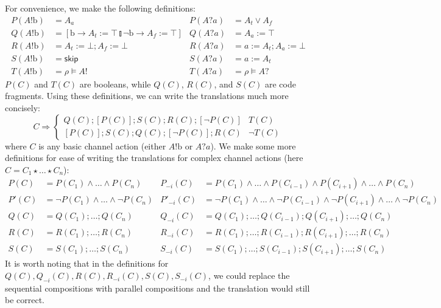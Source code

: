 \documentclass[times, 10pt]{article}
\begin{document}
For convenience, we make the following definitions:
\begin{align*}
    P(A!\mathrm{b}) & = A_a & P(A?a) & = A_t \vee A_f \\
    Q(A!\mathrm{b}) & = [\mathrm{b} \rightarrow A_t := \top \talloblong \neg \mathrm{b} \rightarrow A_f := \top] & Q(A?a) & = A_a := \top \\
    R(A!\mathrm{b}) & = A_t := \bot; A_f := \bot & R(A?a) & = a := A_t; A_a := \bot \\
    S(A!\mathrm{b}) & = \mathsf{skip} & S(A?a) & = a := A_t \\
    T(A!\mathrm{b}) & = \rho \vDash A! & T(A?a) & = \rho \vDash A?
\end{align*}
$P(C)$ and $T(C)$ are booleans, while $Q(C)$, $R(C)$, and $S(C)$ are code
fragments. Using these definitions, we can write the translations much more
concisely:
$$
    C \Rightarrow \begin{cases}
        Q(C); [P(C)]; S(C); R(C); [\neg P(C)] & T(C) \\
        [P(C)]; S(C); Q(C); [\neg P(C)]; R(C) & \neg T(C)
    \end{cases}
$$
where $C$ is any basic channel action (either $A!\mathrm{b}$ or $A?a$). We make
some more definitions for ease of writing the translations for complex channel
actions (here $C = C_1 \star \ldots \star C_n$):
\begin{align*}
    P(C) & = P(C_1) \wedge \ldots \wedge P(C_n) & P_{-i}(C) & = P(C_1) \wedge \ldots \wedge P(C_{i - 1}) \wedge P(C_{i + 1}) \wedge \ldots \wedge P(C_n) \\
    P'(C) & = \neg P(C_1) \wedge \ldots \wedge \neg P(C_n) & P'_{-i}(C) & = \neg P(C_1) \wedge \ldots \wedge \neg P(C_{i - 1}) \wedge \neg P(C_{i + 1}) \wedge \ldots \wedge \neg P(C_n) \\
    Q(C) & = Q(C_1); \ldots; Q(C_n) & Q_{-i}(C) & = Q(C_1); \ldots; Q(C_{i - 1}); Q(C_{i + 1}); \ldots; Q(C_n) \\
    R(C) & = R(C_1); \ldots; R(C_n) & R_{-i}(C) & = R(C_1); \ldots; R(C_{i - 1}); R(C_{i + 1}); \ldots; R(C_n) \\
    S(C) & = S(C_1); \ldots; S(C_n) & S_{-i}(C) & = S(C_1); \ldots; S(C_{i - 1}); S(C_{i + 1}); \ldots; S(C_n)
\end{align*}
It is worth noting that in the definitions for $Q(C), Q_{-i}(C), R(C),
R_{-i}(C), S(C), S_{-i}(C)$, we could replace the sequential compositions with
parallel compositions and the translation would still be correct.
\end{document}
